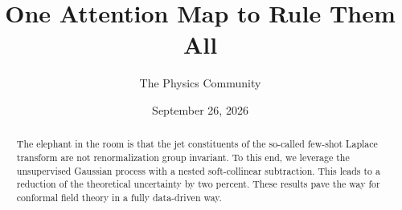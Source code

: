 \documentclass[11pt]{article}
\title{One Attention Map to Rule Them All}
\author{The Physics Community}
\date{September 26, 2026}
\numberwithin{equation}{section}
\theoremstyle{definition}
\theoremstyle{remark}
\begin{document}
\maketitle
\begin{abstract}
The elephant in the room is that the jet constituents of the so-called
few-shot Laplace transform are not renormalization group invariant. To
this end, we leverage the unsupervised Gaussian process with a nested
soft-collinear subtraction. This leads to a reduction of the theoretical
uncertainty by two percent. These results pave the way for conformal
field theory in a fully data-driven way.
\end{abstract}
\tableofcontents




\nocite{*}


\end{document}
